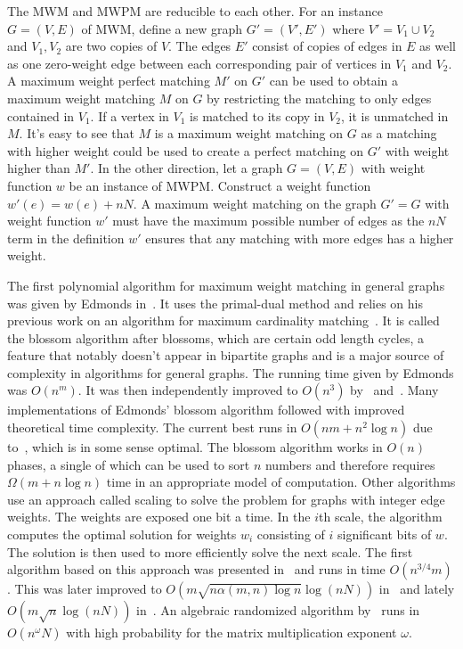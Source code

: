The \textsc{MWM} and \textsc{MWPM} are reducible to each other. For an instance $G=(V, E)$ of \textsc{MWM}, define a new graph $G'=(V', E')$ where $V'=V_1 \cup V_2$ and $V_1, V_2$ are two copies of $V$. The edges $E'$ consist of copies of edges in $E$ as well as one zero-weight edge between each corresponding pair of vertices in $V_1$ and $V_2$. A maximum weight perfect matching $M'$ on $G'$ can be used to obtain a maximum weight matching $M$ on $G$ by restricting the matching to only edges contained in $V_1$. If a vertex in $V_1$ is matched to its copy in $V_2$, it is unmatched in $M$. It's easy to see that $M$ is a maximum weight matching on $G$ as a matching with higher weight could be used to create a perfect matching on $G'$ with weight higher than $M'$. In the other direction, let a graph $G=(V, E)$ with weight function $w$ be an instance of \textsc{MWPM}. Construct a weight function $w'(e) = w(e) + nN$. A maximum weight matching on the graph $G' = G$ with weight function $w'$ must have the maximum possible number of edges as the $nN$ term in the definition $w'$ ensures that any matching with more edges has a higher weight.

The first polynomial algorithm for maximum weight matching in general graphs was given by Edmonds in~\cite{edmonds1965maximum}. It uses the primal-dual method and relies on his previous work on an algorithm for maximum cardinality matching~\cite{edmonds1965paths}. It is called the blossom algorithm after blossoms, which are certain odd length cycles, a feature that notably doesn't appear in bipartite graphs and is a major source of complexity in algorithms for general graphs. The running time given by Edmonds was $O(n^m)$. It was then independently improved to $O(n^3)$ by~\cite{lawler2001combinatorial} and~\cite{gabow1974implementation}. Many implementations of Edmonds' blossom algorithm followed with improved theoretical time complexity. The current best runs in $O(nm + n^2 \log n)$ due to~\cite{gabow1990data}, which is in some sense optimal. The blossom algorithm works in $O(n)$ phases, a single of which can be used to sort $n$ numbers and therefore requires $\Omega(m + n \log n)$ time in an appropriate model of computation. Other algorithms use an approach called scaling to solve the problem for graphs with integer edge weights. The weights are exposed one bit a time. In the $i$th scale, the algorithm computes the optimal solution for weights $w_i$ consisting of $i$ significant bits of $w$. The solution is then used to more efficiently solve the next scale. The first algorithm based on this approach was presented in~\cite{gabow1984efficient} and runs in time $O(n^{3/4}m)$. This was later improved to $O(m \sqrt{n\alpha(m, n) \log n} \log(nN))$ in~\cite{gabow1991faster} and lately $O(m \sqrt{n} \log(nN))$ in~\cite{duan2018scaling}. An algebraic randomized algorithm by~\cite{cygan2015algorithmic} runs in $O(n^\omega N)$ with high probability for the matrix multiplication exponent $\omega$.

